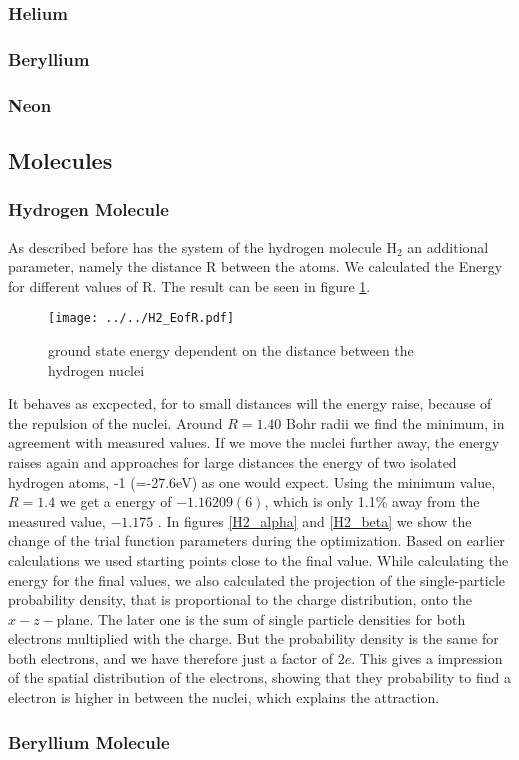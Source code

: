 \documentclass[a4paper,10pt]{article}
\begin{document}
\subsubsection{Helium}
\subsubsection{Beryllium}
\subsubsection{Neon}

\subsection{Molecules}
\subsubsection{Hydrogen Molecule}
As described before has the system of the hydrogen molecule $\text{H}_2$ an additional parameter, namely the distance R between the atoms. 
We calculated the Energy for different values of R. The result can be seen in figure \ref{EofR}. 
\begin{figure}[htbp]
 \label{EofR}
 \texttt{[image: ../../H2\_EofR.pdf]}
 \caption{ground state energy dependent on the distance between the hydrogen nuclei}
\end{figure}
It behaves as excpected, for to small distances 
will the energy raise, because of the repulsion of the nuclei. Around $R=1.40$ Bohr radii we find the minimum, in agreement with measured values. 
If we move the nuclei further away, the energy raises again and approaches for large distances the energy of two isolated hydrogen atoms, -1 (=-27.6eV) as one would expect.
Using the minimum value, $R=1.4$ we get a energy of $-1.16209(6)$, which is only 1.1\% away from the measured value, $-1.175$ .
In figures \ref{H2_alpha} and \ref{H2_beta}
we show the change of the trial function parameters during the optimization. Based on earlier calculations we used 
starting points close to the final value. 
While calculating the energy for the final values, we also calculated the projection
of the single-particle probability density, that is proportional to the charge distribution, 
onto the $x-z-$plane. 
The later one is the sum of single particle densities for both electrons multiplied with the charge.
But the probability density is the same for both electrons, and we have therefore just a factor of $2e$. 
This gives a impression of the spatial distribution of the electrons, showing that they probability to find a electron is higher in between the
nuclei, which explains the attraction. 





\subsubsection{Beryllium Molecule}
\end{document}
